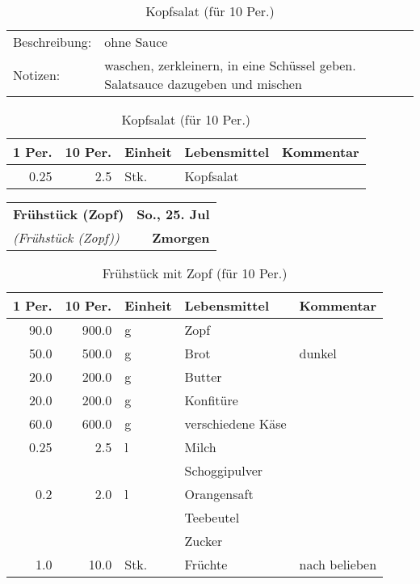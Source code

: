 \documentclass[11pt,a4paper]{article}%
\begin{document}
%
\vspace{0.75cm}%
\renewcommand{\arraystretch}{1.25}%


\begin{table}[h]%
\caption{Kopfsalat (für 10 Per.)}%
\begin{tabularx}{\textwidth}{l X}%
Beschreibung: &ohne Sauce\\%
Notizen:&waschen, zerkleinern, in eine Schüssel geben. Salatsauce dazugeben und mischen\\%
\end{tabularx}%
\par%
\begin{tabularx}{\textwidth}{| r | r | l | l | X |}%
\hline%
\tiny{1 Per.}&\tiny{10 Per.}&\tiny{Einheit}&\tiny{Lebensmittel}&\tiny{Kommentar}\\%
\hline%
0.25&2.5&Stk.&Kopfsalat&\\%
\hline%
\end{tabularx}%
\end{table}

%
\clearpage%
\pagebreak%
\renewcommand{\arraystretch}{1.75}%
%
%


\begin{table}%
\begin{tabularx}{\textwidth}{X r}%
\LARGE \textbf{Frühstück (Zopf)}&\color{gray} \large \textbf{So., 25. Jul}\\%
\small \textit{(Frühstück (Zopf))}&\color{gray} \large \textbf{Zmorgen}\\%
\hline%
\end{tabularx}%
\end{table}

%
%
\vspace{0.75cm}%
\renewcommand{\arraystretch}{1.25}%


\begin{table}[h]%
\caption{Frühstück mit Zopf (für 10 Per.)}%
\par%
\begin{tabularx}{\textwidth}{| r | r | l | l | X |}%
\hline%
\tiny{1 Per.}&\tiny{10 Per.}&\tiny{Einheit}&\tiny{Lebensmittel}&\tiny{Kommentar}\\%
\hline%
90.0&900.0&g&Zopf&\\%
\hline%
50.0&500.0&g&Brot&dunkel\\%
\hline%
20.0&200.0&g&Butter&\\%
\hline%
20.0&200.0&g&Konfitüre&\\%
\hline%
60.0&600.0&g&verschiedene Käse&\\%
\hline%
0.25&2.5&l&Milch&\\%
\hline%
&&&Schoggipulver&\\%
\hline%
0.2&2.0&l&Orangensaft&\\%
\hline%
&&&Teebeutel&\\%
\hline%
&&&Zucker&\\%
\hline%
1.0&10.0&Stk.&Früchte&nach belieben\\%
\hline%
\end{tabularx}%
\end{table}
\end{document}
